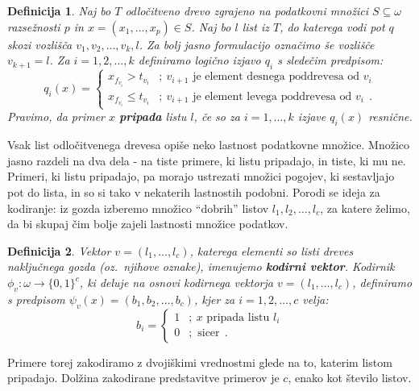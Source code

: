 \documentclass[12pt,a4paper]{article}
\newtheorem{definicija}{Definicija}
\begin{document}
\begin{definicija}
\label{def-pripadnost-listu}
Naj bo $T$ odločitveno drevo zgrajeno na podatkovni množici $S \subseteq \omega$ razsežnosti $p$ in $x=(x_1,\ldots,x_p) \in S$. 
Naj bo $l$ list iz $T$, do katerega vodi pot $q$ skozi vozlišča $v_1, v_2, \ldots, v_k, l$. 
Za bolj jasno formulacijo označimo še vozlišče $v_{k+1} = l$.
Za $i=1,2,\ldots,k$ definiramo logično izjavo $q_i$ s sledečim predpisom:
\[
q_i(x) =
\begin{cases}
x_{f_{v_i}} > t_{v_i} &;\ v_{i+1} \text{ je element desnega poddrevesa od } v_i \\
x_{f_{v_i}} \leq t_{v_i} &;\ v_{i+1} \text{ je element levega poddrevesa od } v_i\ \ .
\end{cases}
\]
Pravimo, da primer $x$ \textbf{pripada} listu $l$, če so za $i=1,\ldots,k$ izjave $q_i(x)$ resnične.
\end{definicija}

Vsak list odločitvenega drevesa opiše neko lastnost podatkovne množice. Množico jasno razdeli na dva dela - na tiste primere, ki listu pripadajo, in tiste, ki mu ne. 
Primeri, ki listu pripadajo, pa morajo ustrezati množici pogojev, ki sestavljajo pot do lista, in so si tako v nekaterih lastnostih podobni. 
Porodi se ideja za kodiranje: iz gozda izberemo množico ``dobrih'' listov $l_1, l_2, \ldots, l_c$, za katere želimo, da bi skupaj čim bolje zajeli lastnosti množice podatkov. 
\begin{definicija}
\label{def-kodiranje}
	Vektor $v=(l_1,\ldots,l_c)$, katerega elementi so listi dreves naključnega gozda (oz.~njihove oznake), imenujemo \textbf{kodirni vektor}.
	Kodirnik $\phi_v: \omega \rightarrow \{0,1\}^c$, ki deluje na osnovi kodirnega vektorja $v=(l_1,\ldots, l_c)$, definiramo s predpisom $\psi_v(x) = (b_1, b_2, \ldots, b_c)$, kjer za $i=1,2,\ldots,c$ velja:
	$$
	b_i = 
	\begin{cases}
	1 &;\ x \text{ pripada listu } l_i \\
	0 &; \text{ sicer}\ \ .
	\end{cases}
	$$
\end{definicija}
Primere torej zakodiramo z dvojiškimi vrednostmi glede na to, katerim listom pripadajo. Dolžina zakodirane predstavitve primerov je $c$, enako kot število listov. 
\end{document}
